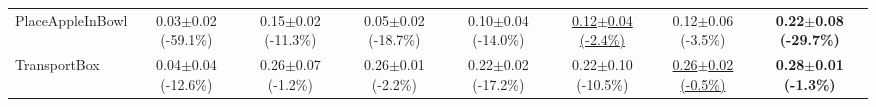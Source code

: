 \begin{table}[htbp]
\begin{adjustbox}{max width=\textwidth}
\begin{tabular}{l*{7}{c}}
PlaceAppleInBowl & 0.03$\pm$0.02 \scriptsize{(-59.1\%)} & 0.15$\pm$0.02 \scriptsize{(-11.3\%)} & 0.05$\pm$0.02 \scriptsize{(-18.7\%)} & 0.10$\pm$0.04 \scriptsize{(-14.0\%)} & \underline{0.12$\pm$0.04 \scriptsize{(-2.4\%)}} & 0.12$\pm$0.06 \scriptsize{(-3.5\%)} & \textbf{0.22$\pm$0.08 \scriptsize{(-29.7\%)}} \\
TransportBox & 0.04$\pm$0.04 \scriptsize{(-12.6\%)} & 0.26$\pm$0.07 \scriptsize{(-1.2\%)} & 0.26$\pm$0.01 \scriptsize{(-2.2\%)} & 0.22$\pm$0.02 \scriptsize{(-17.2\%)} & 0.22$\pm$0.10 \scriptsize{(-10.5\%)} & \underline{0.26$\pm$0.02 \scriptsize{(-0.5\%)}} & \textbf{0.28$\pm$0.01 \scriptsize{(-1.3\%)}} \\
\bottomrule
\end{tabular}
\end{adjustbox}
\end{table}

